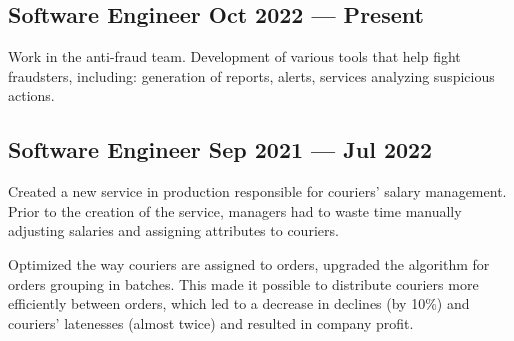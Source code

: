 \documentclass[letter,10pt]{article}
\begin{document}

\subsection{{Software Engineer \hfill Oct 2022 --- Present}}
\begin{zitemize}
\item Work in the anti-fraud team. Development of various tools that help fight fraudsters, including: generation of reports, alerts, services analyzing suspicious actions.
\end{zitemize}

\subsection{{Software Engineer \hfill Sep 2021 --- Jul 2022}}
\begin{zitemize}
\item Created a new service in production responsible for couriers' salary management. Prior to the creation of the service, managers had to waste time manually adjusting salaries and assigning attributes to couriers.
\item Optimized the way couriers are assigned to orders, upgraded the algorithm for orders grouping in batches. This made it possible to distribute couriers more efficiently between orders, which led to a decrease in declines (by 10\%) and couriers' latenesses (almost twice) and resulted in company profit.
\end{zitemize}
\end{document}
